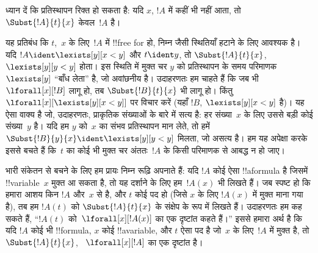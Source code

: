 \documentclass[../../../include/open-logic-section]{subfiles}
\begin{document}
\begin{explain}
ध्यान दें कि प्रतिस्थापन रिक्त हो सकता है: यदि $x$, $!A$ में कहीं भी नहीं
आता, तो $\Subst{!A}{t}{x}$ केवल~$!A$ है।

यह प्रतिबंध कि $t$,~$x$ के लिए~$!A$ में !!{free for} हो, निम्न जैसी
स्थितियाँ हटाने के लिए आवश्यक है। यदि $!A \ident \lexists[y][x < y]$ और
$t \ident y$, तो $\Subst{!A}{t}{x}$, $\lexists[y][y <
  y]$ होता। इस स्थिति में
मुक्त चर $y$ को प्रतिस्थापन के समय परिमाणक $\lexists[y]$ ``बाँध लेता'' है,
जो अवांछनीय है। उदाहरणतः हम चाहते हैं कि जब भी $\lforall[x][!B]$ लागू हो,
तब $\Subst{!B}{t}{x}$ भी लागू हो। किंतु $\lforall[x][\lexists[y][x < y]]$
पर विचार करें (यहाँ $!B$, $\lexists[y][x <
  y]$ है)। यह ऐसा वाक्य है जो,
उदाहरणतः, प्राकृतिक संख्याओं के बारे में सत्य है: हर संख्या~$x$ के लिए उससे
बड़ी कोई संख्या~$y$ है। यदि हम $y$ को~$x$ का संभव प्रतिस्थापन मान लेते, तो
हमें $\Subst{!B}{y}{x} \ident \lexists[y][y < y]$ मिलता, जो असत्य है। हम
यह अपेक्षा करके इससे बचते हैं कि~$t$ का कोई भी मुक्त चर अंततः~$!A$ के किसी
परिमाणक से आबद्ध न हो जाए।
\end{explain}

भारी संकेतन से बचने के लिए हम प्रायः निम्न रूढ़ि अपनाते हैं: यदि $!A$ कोई
ऐसा !!a{formula} है जिसमें !!{variable}~$x$ मुक्त आ सकता है, तो यह दर्शाने
के लिए हम~$!A(x)$ भी लिखते हैं। जब स्पष्ट हो कि हमारा आशय किन $!A$ और~$x$
से है, और $t$ कोई पद हो (जिसे $x$ के लिए $!A(x)$ में मुक्त माना गया है), तब
हम $!A(t)$ को $\Subst{!A}{t}{x}$ के संक्षेप के रूप में लिखते हैं। उदाहरणतः हम
कह सकते हैं, ``$!A(t)$ को~$\lforall[x][!A(x)]$ का एक दृष्टांत कहते हैं।''
इससे हमारा अर्थ है कि यदि $!A$ कोई भी !!{formula}, $x$ कोई !!a{variable}, और
$t$ ऐसा पद है जो~$x$ के लिए~$!A$ में मुक्त है, तो $\Subst{!A}{t}{x}$,
~$\lforall[x][!A]$ का एक दृष्टांत है।
\end{document}
